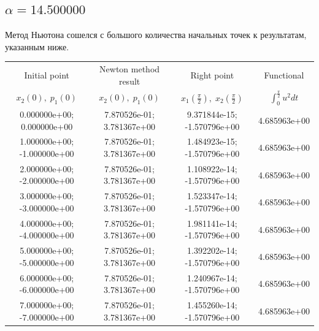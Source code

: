 \documentclass[titlepage]{article}
\def\l{\left}
\def\r{\right}
\begin{document}
\subsection{$\alpha = 14.500000$} 
Метод Ньютона сошелся с большого количества начальных точек к результатам, указанным ниже. \\ 
\begin{tabular}{ | c | c | c | c |} 
\hline 
Initial point  & Newton method result & Right point & Functional 
 \\ $x_2(0), \; p_1(0)$ & $x_2(0), \; p_1(0)$ & $x_1\l(\frac{\pi}{2}\r), \; x_2\l(\frac{\pi}{2}\r)$ & $\int_{0}^{\frac{\pi}{2}}u^2dt$  \\ \hline 
0.000000e+00; 0.000000e+00 & 7.870526e-01; 3.781367e+00 & 9.371844e-15; -1.570796e+00 & 4.685963e+00 \\ \hline 
1.000000e+00; -1.000000e+00 & 7.870526e-01; 3.781367e+00 & 1.484923e-15; -1.570796e+00 & 4.685963e+00 \\ \hline 
2.000000e+00; -2.000000e+00 & 7.870526e-01; 3.781367e+00 & 1.108922e-14; -1.570796e+00 & 4.685963e+00 \\ \hline 
3.000000e+00; -3.000000e+00 & 7.870526e-01; 3.781367e+00 & 1.523347e-14; -1.570796e+00 & 4.685963e+00 \\ \hline 
4.000000e+00; -4.000000e+00 & 7.870526e-01; 3.781367e+00 & 1.981141e-14; -1.570796e+00 & 4.685963e+00 \\ \hline 
5.000000e+00; -5.000000e+00 & 7.870526e-01; 3.781367e+00 & 1.392202e-14; -1.570796e+00 & 4.685963e+00 \\ \hline 
6.000000e+00; -6.000000e+00 & 7.870526e-01; 3.781367e+00 & 1.240967e-14; -1.570796e+00 & 4.685963e+00 \\ \hline 
7.000000e+00; -7.000000e+00 & 7.870526e-01; 3.781367e+00 & 1.455260e-14; -1.570796e+00 & 4.685963e+00 \\ \hline 
\end{tabular} 
\end{document}
